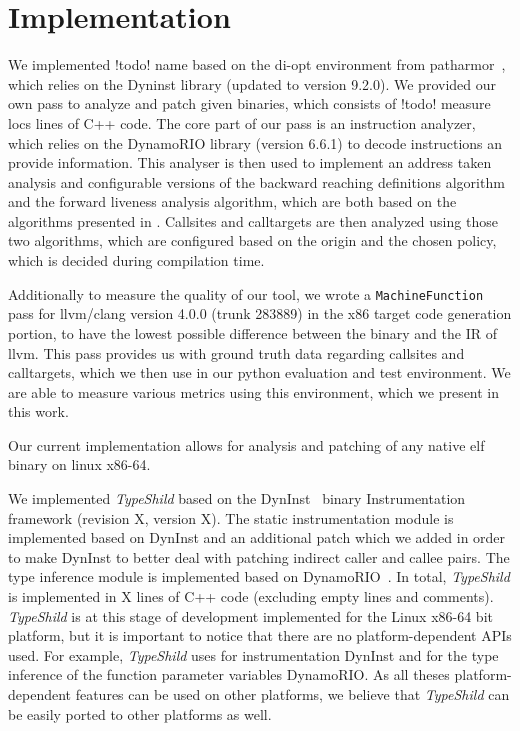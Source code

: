 \chapter{Implementation}
\label{chapter:Implementation}
We implemented {!todo! name} based on the di-opt environment from patharmor~\cite{veen:typearmor}, which relies on the 
Dyninst library \cite{bernat:dyninst} (updated to version 9.2.0). We provided our own pass to analyze and 
patch given binaries, which consists of {!todo! measure locs} lines of C++ code. The core part of our pass
is an instruction analyzer, which relies on the DynamoRIO library \cite{dynamorio:drmemory} (version 6.6.1) 
to decode instructions an provide information. This analyser is then used to implement an address taken 
analysis and configurable versions of the backward reaching definitions algorithm and the forward liveness
analysis algorithm, which are both based on the algorithms presented in \cite{veen:typearmor}. Callsites and 
calltargets are then analyzed using those two algorithms, which are configured based on the origin and 
the chosen policy, which is decided during compilation time.

Additionally to measure the quality of our tool, we wrote a \texttt{MachineFunction} pass for llvm/clang version 4.0.0 (trunk 283889)
in the x86 target code generation portion, to have the lowest possible difference between the binary and the IR of llvm.
This pass provides us with ground truth data regarding callsites and calltargets, which we then use in our 
python evaluation and test environment. We are able to measure various metrics using this environment, 
which we present in this work.

Our current implementation allows for analysis and patching of any native elf binary on linux x86-64. 


We implemented \textit{TypeShild} based on the DynInst~\cite{bernat:dyninst}
binary Instrumentation framework (revision X, version X).
The static instrumentation module is implemented based on DynInst
and an additional patch which we added in order to make DynInst to
better deal with patching indirect caller and callee pairs.
The type inference module is implemented based on DynamoRIO~\cite{dynamorio:drmemory}.
In total, \textit{TypeShild} is implemented in X lines of C++ 
code (excluding empty lines and comments).
\textit{TypeShild} is at this stage of development implemented 
for the Linux x86-64 bit platform, but it is important to notice that there are
no platform-dependent APIs used.
For example, \textit{TypeShild} uses for instrumentation
DynInst and for the type inference of the function parameter variables
DynamoRIO. As all theses platform-dependent features can be used on other platforms,
we believe that \textit{TypeShild} can be easily ported to other platforms as well.

